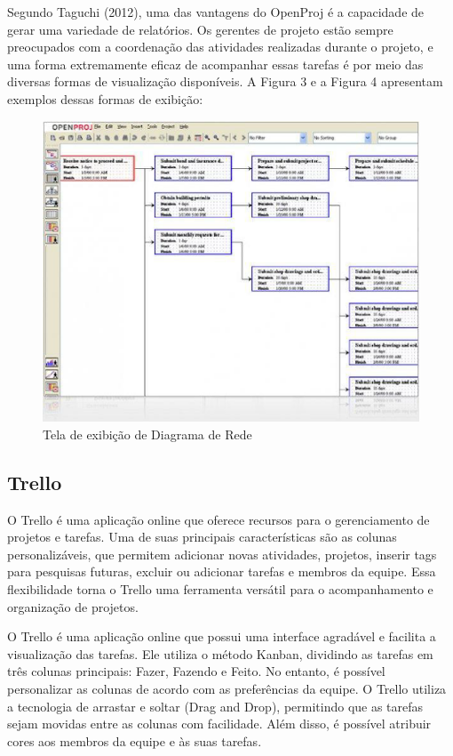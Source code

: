 Segundo Taguchi (2012), uma das vantagens do OpenProj é a capacidade de gerar uma variedade de relatórios. Os gerentes de projeto estão sempre preocupados com a coordenação das atividades realizadas durante o projeto, e uma forma extremamente eficaz de acompanhar essas tarefas é por meio das diversas formas de visualização disponíveis. A Figura 3 e a Figura 4 apresentam exemplos dessas formas de exibição:

\begin{figure}[htb]
	\caption{\label{fig:Fig_4}Tela de exibição de Diagrama de Rede}
	\begin{center}
		\includegraphics[scale=0.3]{figuras/Imagem4.png}
	\end{center}
\end{figure}

\subsection{Trello}

O Trello é uma aplicação online que oferece recursos para o gerenciamento de projetos e tarefas. Uma de suas principais características são as colunas personalizáveis, que permitem adicionar novas atividades, projetos, inserir tags para pesquisas futuras, excluir ou adicionar tarefas e membros da equipe. Essa flexibilidade torna o Trello uma ferramenta versátil para o acompanhamento e organização de projetos.

O Trello é uma aplicação online que possui uma interface agradável e facilita a visualização das tarefas. Ele utiliza o método Kanban, dividindo as tarefas em três colunas principais: Fazer, Fazendo e Feito. No entanto, é possível personalizar as colunas de acordo com as preferências da equipe. O Trello utiliza a tecnologia de arrastar e soltar (Drag and Drop), permitindo que as tarefas sejam movidas entre as colunas com facilidade. Além disso, é possível atribuir cores aos membros da equipe e às suas tarefas.

